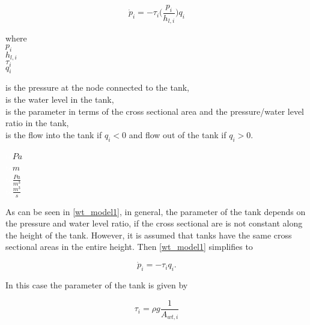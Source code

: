 \begin{equation}
\label{wt_model1}
\dot{p}_i = -\tau_i\Big(\frac{p_i}{h_{l,i}}\Big) q_i
\end{equation}

 \begin{minipage}[t]{0.20\textwidth}
where\\
\hspace*{8mm} $p_i$ \\
\hspace*{8mm} $h_{l,i}$ \\
\hspace*{8mm} $\tau_i$ \\
\newline
\hspace*{8mm} $q_i$ 
\end{minipage}
\begin{minipage}[t]{0.68\textwidth}
\vspace*{2mm}
is the pressure at the node connected to the tank,\\ 
is the water level in the tank,\\ 
is the parameter in terms of the cross sectional area and the pressure/water level ratio in the tank,\\
is the flow into the tank if $q_i < 0$ and flow out of the tank if $q_i > 0$.
\end{minipage}
\begin{minipage}[t]{0.10\textwidth}
\vspace*{2mm}
\textcolor{White}{te}$\unit{Pa}$\\
\textcolor{White}{te}$\unit{m}$\\
\textcolor{White}{te}$\unit{\frac{Pa}{m^3}}$\\
\textcolor{White}{te}$\unit{\frac{m^3}{s}}$
\end{minipage} 

As can be seen in \eqref{wt_model1}, in general, the parameter of the tank depends on the pressure and water level ratio, if the cross sectional are is not constant along the height of the tank. However, it is assumed that tanks have the same cross sectional areas in the entire height. Then \eqref{wt_model1} simplifies to

\begin{equation}
\label{wt_model2}
\dot{p}_i = -\tau_i q_i.
\end{equation}

In this case the parameter of the tank is given by 

\begin{equation}
\label{wt_model3}
\tau_i = \rho g \frac{1}{A_{wt,i}}
\end{equation}

